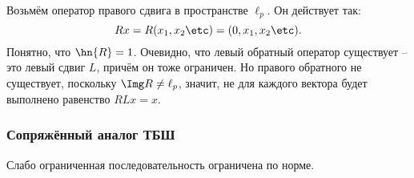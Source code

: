\documentclass[a4paper]{article}
\begin{document}
\begin{ex}
Возьмём оператор правого сдвига в пространстве $\ell_p$. Он действует так:
$$Rx = R(x_1,x_2\etc) = (0,x_1,x_2\etc).$$
Понятно, что $\hn{R} = 1$. Очевидно, что левый обратный оператор существует -- это левый сдвиг $L$,
причём он тоже ограничен. Но правого обратного не существует, поскольку $\Img R \neq \ell_p$, значит,
не для каждого вектора будет выполнено равенство $R L x=x$.
\end{ex}


\subsubsection{Сопряжённый аналог ТБШ}
\label{sssec:adjoint.banach-shteinhouse}

\begin{theorem}
Слабо ограниченная последовательность ограничена по норме.
\end{theorem}
\end{document}
